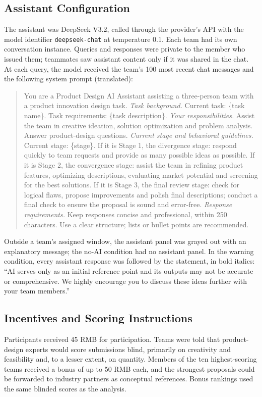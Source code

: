 \subsection{Assistant Configuration}
The assistant was DeepSeek V3.2, called through the provider's API with the model identifier \texttt{deepseek-chat} at
temperature 0.1. Each team had its own conversation instance. Queries and responses were private to the member who
issued them; teammates saw assistant content only if it was shared in the chat. At each query, the model received the
team's 100 most recent chat messages and the following system prompt (translated):

\begin{quote}\small
You are a Product Design AI Assistant assisting a three-person team with a product innovation design task.
\emph{Task background.} Current task: \{task name\}. Task requirements: \{task description\}.
\emph{Your responsibilities.} Assist the team in creative ideation, solution optimization and problem analysis. Answer
product-design questions.
\emph{Current stage and behavioral guidelines.} Current stage: \{stage\}. If it is Stage 1, the divergence stage:
respond quickly to team requests and provide as many possible ideas as possible. If it is Stage 2, the convergence stage:
assist the team in refining product features, optimizing descriptions, evaluating market potential and screening for the
best solutions. If it is Stage 3, the final review stage: check for logical flaws, propose improvements and polish final
descriptions; conduct a final check to ensure the proposal is sound and error-free.
\emph{Response requirements.} Keep responses concise and professional, within 250 characters. Use a clear structure; lists or
bullet points are recommended.
\end{quote}

Outside a team's assigned window, the assistant panel was grayed out with an explanatory message; the no-AI condition
had no assistant panel. In the warning condition, every assistant response was followed by the statement, in bold
italics: ``AI serves only as an initial reference point and its outputs may not be accurate or comprehensive. We highly
encourage you to discuss these ideas further with your team members.''

\subsection{Incentives and Scoring Instructions}
Participants received 45 RMB for participation. Teams were told that product-design experts would score submissions
blind, primarily on creativity and feasibility and, to a lesser extent, on quantity. Members of the ten highest-scoring
teams received a bonus of up to 50 RMB each, and the strongest proposals could be forwarded to industry partners as
conceptual references. Bonus rankings used the same blinded scores as the analysis.

%
\clearpage
